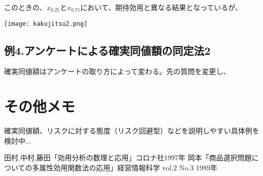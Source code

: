 \documentclass[a4j,12pt]{jsarticle}
\begin{document}
このときの、$x_{0.25}$と$x_{0.75}$において、期待効用と異なる結果となっているが、

\begin{center}
\texttt{[image: kakujitsu2.png]}
\end{center}

\subsection{例4.アンケートによる確実同値額の同定法2}

確実同値額はアンケートの取り方によって変わる。先の質問を変更し、

\section{その他メモ}

確実同値額、リスクに対する態度（リスク回避型）などを説明しやすい具体例を検討中$\dots$



\begin{thebibliography}{99}
 田村,中村,藤田「効用分析の数理と応用」コロナ社1997年
 岡本「商品選択問題についての多属性効用関数法の応用」経営情報科学 vol.2 No.3 1989年
\end{thebibliography}
\end{document}
